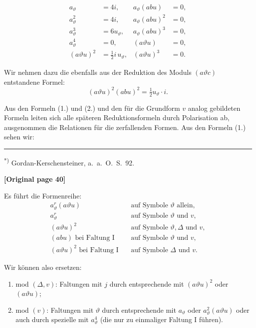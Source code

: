 \documentclass[12pt,a4paper]{article}
\begin{document}
\begin{equation}\tag{1.}
\begin{aligned}
a_\vartheta &= 4i, & a_\vartheta (abu) &= 0,\\
a_\vartheta^2 &= 4i, & a_\vartheta (abu)^2 &= 0,\\
a_\vartheta^3 &= 6u_\vartheta, & a_\vartheta (abu)^3 &= 0,\\
a_\vartheta^4 &= 0, & (a\vartheta u) &= 0,\\
(a\vartheta u)^2 &= \tfrac{1}{2} i \, u_\vartheta, & (a\vartheta u)^3 &= 0.
\end{aligned}
\end{equation}

Wir nehmen dazu die ebenfalls aus der Reduktion des Moduls $(a\vartheta c)$ entstandene Formel:
\begin{equation}\tag{2.}
(a\vartheta u)^2 (abu)^2 = \tfrac{1}{2} u_\vartheta \cdot i.
\end{equation}

Aus den Formeln (1.) und (2.) und den für die Grundform $v$ analog gebildeten Formeln leiten sich alle späteren Reduktionsformeln durch Polarisation ab, ausgenommen die Relationen für die zerfallenden Formen. Aus den Formeln (1.) sehen wir:

\smallskip
\noindent\rule{\textwidth}{0.4pt}
\small
\textsuperscript{*)} Gordan-Kerschensteiner, a.\ a.\ O.\ S.~92.
\normalsize


\noindent\textbf{[Original page 40]}

Es führt die Formenreihe:
\begin{align*}
a_\vartheta^r (a\vartheta u) &\quad\text{auf Symbole } \vartheta \text{ allein,}\\
a_\vartheta^r &\quad\text{auf Symbole } \vartheta \text{ und } v,\\
(a\vartheta u)^2 &\quad\text{auf Symbole } \vartheta, \varDelta \text{ und } v,\\
(abu) \text{ bei Faltung I} &\quad\text{auf Symbole } \vartheta \text{ und } v,\\
(a\vartheta u)^2 \text{ bei Faltung I} &\quad\text{auf Symbole } \varDelta \text{ und } v.
\end{align*}

Wir können also ersetzen:
\begin{enumerate}
\item[1)] mod $(\varDelta, v)$: Faltungen mit $j$ durch entsprechende mit $(a\vartheta u)^2$ oder $(a\vartheta u)$;
\item[2)] mod $(v)$: Faltungen mit $\vartheta$ durch entsprechende mit $a_\vartheta$ oder $a_\vartheta^2 (a\vartheta u)$ oder auch durch spezielle mit $a_\vartheta^4$ (die nur zu einmaliger Faltung I führen).
\end{enumerate}
\end{document}
